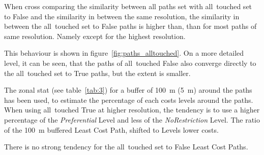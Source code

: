 When cross comparing the similarity between all paths set with all~touched set to False and the similarity in between the same resolution, the similarity in between the all~touched set to False paths is higher than, than for most paths of same resolution.
Namely except for the highest resolution.

This behaviour is shown in figure~\ref{fig:paths_alltouched}.
On a more detailed level, it can be seen, that the paths of all~touched False also converge directly to the all~touched set to True paths, but the extent is smaller.


The zonal stat (see table~\ref{tab:3}) for a buffer of 100~m (5~m) around the paths has been used, to estimate the
percentage of each costs levels around the paths.
When using all~touched True at higher resolution, the tendency is to use a higher percentage of the
\textit{Preferential} Level and less of the \textit{NoRestriction} Level.
The ratio of the 100~m buffered Least Cost Path, shifted  to Levels lower costs.

There is no strong tendency for the all~touched set to False Least Cost Paths.

\setlength{\tabcolsep}{10pt}

